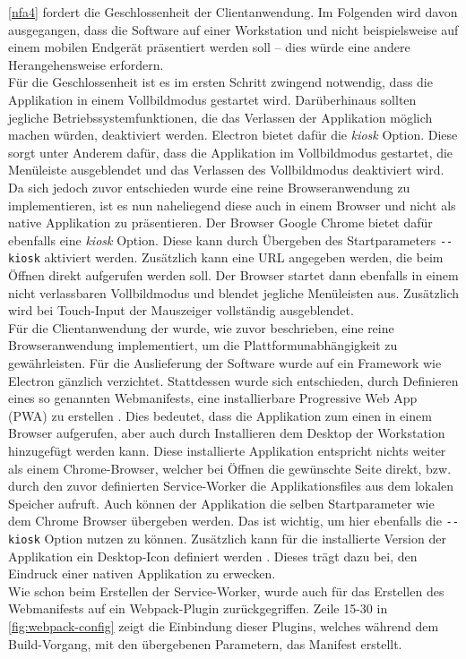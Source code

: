 \ref{nfa4} fordert die Geschlossenheit der Clientanwendung. Im Folgenden wird davon ausgegangen, 
dass die Software auf einer Workstation und nicht beispielsweise auf einem mobilen Endgerät präsentiert
werden soll -- dies würde eine andere Herangehensweise erfordern.\\
Für die Geschlossenheit ist es im ersten Schritt zwingend notwendig, dass die Applikation in einem 
Vollbildmodus gestartet wird. Darüberhinaus sollten jegliche Betriebssystemfunktionen, die das 
Verlassen der Applikation möglich machen würden, deaktiviert werden. Electron bietet dafür
die \emph{kiosk} Option. Diese sorgt unter Anderem dafür, dass die Applikation im Vollbildmodus gestartet, 
die Menüleiste ausgeblendet und das Verlassen des Vollbildmodus deaktiviert wird.\\
Da sich jedoch zuvor entschieden wurde eine reine Browseranwendung zu implementieren, ist es nun naheliegend 
diese auch in einem Browser und nicht als native Applikation zu präsentieren. Der Browser Google Chrome bietet
dafür ebenfalls eine \emph{kiosk} Option. Diese kann durch Übergeben des Startparameters \texttt{-{}-kiosk}
aktiviert werden. Zusätzlich kann eine URL angegeben werden, die beim Öffnen direkt aufgerufen werden soll.
Der Browser startet dann ebenfalls in einem nicht verlassbaren Vollbildmodus und blendet jegliche Menüleisten aus.
Zusätzlich wird bei Touch-Input der Mauszeiger vollständig ausgeblendet.\\

Für die Clientanwendung der \shst{} wurde, wie zuvor beschrieben, eine reine Browseranwendung implementiert,
um die Plattformunabhängigkeit zu gewährleisten. Für die Auslieferung der Software wurde auf ein Framework wie
Electron gänzlich verzichtet. Stattdessen wurde sich entschieden, durch Definieren eines so genannten Webmanifests,
eine installierbare Progressive Web App (PWA) zu erstellen \cite{web-app-manifest}. Dies bedeutet, 
dass die Applikation zum einen in einem Browser aufgerufen, aber auch durch Installieren dem Desktop 
der Workstation hinzugefügt werden kann. Diese installierte Applikation entspricht nichts 
weiter als einem Chrome-Browser, welcher bei Öffnen die gewünschte Seite direkt,
bzw. durch den zuvor definierten Service-Worker die Applikationsfiles aus dem lokalen Speicher aufruft. Auch
können der Applikation die selben Startparameter wie dem Chrome Browser übergeben werden. Das ist wichtig,
um hier ebenfalls die \texttt{-{}-kiosk} Option nutzen zu können.
Zusätzlich kann für die installierte Version der Applikation ein Desktop-Icon definiert werden \cite{web-app-manifest}.
Dieses trägt dazu bei, den Eindruck einer nativen Applikation zu erwecken.\\
Wie schon beim Erstellen der Service-Worker, wurde auch für das Erstellen des Webmanifests auf ein 
Webpack-Plugin \cite{webpack-pwa-manifest-plugin} zurückgegriffen. Zeile 15-30 in \autoref{fig:webpack-config} 
zeigt die Einbindung dieser Plugins, welches während dem Build-Vorgang, mit den übergebenen Parametern, das Manifest erstellt. 
